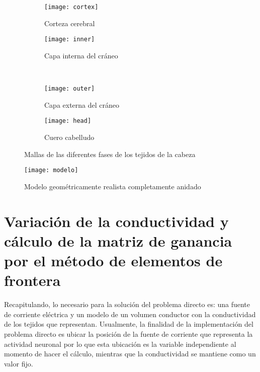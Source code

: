 \begin{figure}[tb]
	\centering
	\begin{subfigure}{0.45\textwidth}
		\texttt{[image: cortex]}
		\caption{Corteza cerebral}
		\label{fig:methodology:cortex}
		\vspace{0.1cm}
	\end{subfigure}\hfill
	\begin{subfigure}{0.45\textwidth}
		\texttt{[image: inner]}
		\caption{Capa interna del cráneo}
		\label{fig:methodology:inner}
		\vspace{0.1cm}
	\end{subfigure}\\
	\begin{subfigure}{0.45\textwidth}
		\texttt{[image: outer]}
		\caption{Capa externa del cráneo}
		\label{fig:methodology:outer}
	\end{subfigure}\hfill
	\begin{subfigure}{0.45\textwidth}
		\texttt{[image: head]}
		\caption{Cuero cabelludo}
		\label{fig:methodology:head}
	\end{subfigure}
	\caption{Mallas de las diferentes fases de los tejidos de la cabeza }
	\label{fig:methodology:meshes}
\end{figure}



\begin{figure}[htb]
	\texttt{[image: modelo]}
	\caption{Modelo geométricamente realista completamente anidado}
	\label{fig:methodology:model}
\end{figure}


\section{Variación de la conductividad y cálculo de la matriz de ganancia por el método de elementos de frontera}
\label{sec:methodology:openmeeg}

Recapitulando, lo necesario para la solución del problema directo es: una fuente de corriente eléctrica y un modelo de un volumen conductor con la conductividad de los tejidos que representan. Usualmente, la finalidad de la implementación del problema directo es ubicar la posición de la fuente de corriente que representa la actividad neuronal por lo que esta ubicación es la variable independiente al momento de hacer el cálculo, mientras que la conductividad se mantiene como un valor fijo.

